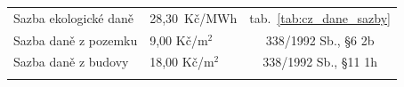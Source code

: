 \begin{landscape}
\begin{table}[p]
\begin{tabular}{llc}
        \addlinespace
        \midrule
        \addlinespace
        
        Sazba ekologické daně    & 28,30~Kč/MWh & tab.~\ref{tab:cz_dane_sazby} \\
        Sazba daně z pozemku    & 9,00 Kč/m$^2$ & 338/1992 Sb., §6 2b \\
        Sazba daně z budovy    & 18,00 Kč/m$^2$ & 338/1992 Sb., §11 1h \\

        \addlinespace
        \bottomrule
    \end{tabular}

\end{table} \end{landscape}
